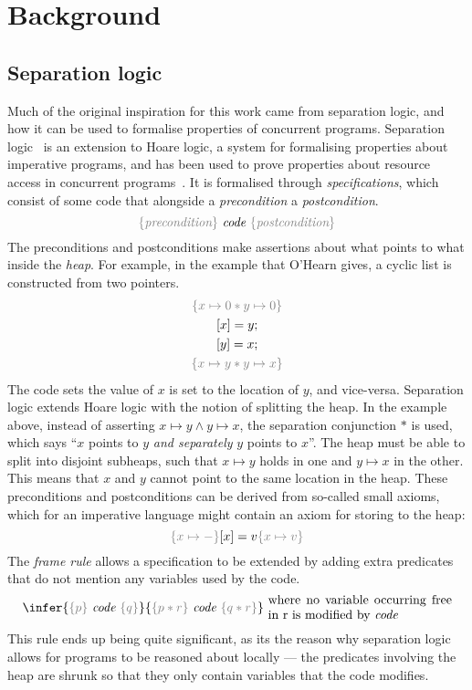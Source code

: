 \chapter{Background}\label{chapter:background}

\section{Separation logic}\label{sec:separationologic}
Much of the original inspiration for this work came from separation
logic, and how it can be used to formalise properties of concurrent
programs. Separation logic~\cite{ohearn2019,reynolds2002} is an
extension to Hoare logic, a system for formalising properties about
imperative programs, and has been used to prove properties about
resource access in concurrent programs~\cite{ohearn2007}. It is
formalised through \emph{specifications}, which consist of some code
that alongside a \emph{precondition} a \emph{postcondition}.
\[
  {\color{gray} \{\textit{precondition}\}} \
  \textit{code} \
  {\color{gray} \{\textit{postcondition}\}}
\]
The preconditions and postconditions make assertions about what points
to what inside the \textit{heap}. For example, in the example that
O'Hearn gives, a cyclic list is constructed from two pointers.
\begin{gather*}
  {\color{gray} \{ x \mapsto 0 * y \mapsto 0 \} }\\
  [x] = y; \\
  [y] = x; \\
  {\color{gray} \{ x \mapsto y * y \mapsto x \} }
\end{gather*}
The code sets the value of $x$ is set to the location of $y$, and
vice-versa. Separation logic extends Hoare logic with the notion of
splitting the heap. In the example above, instead of asserting
$x \mapsto y \wedge y \mapsto x$, the separation conjunction $*$ is used, which says
``$x$ points to $y$ \textit{and separately} $y$ points to $x$''. The
heap must be able to split into disjoint subheaps, such that
$x \mapsto y$ holds in one and $y \mapsto x$ in the other. This means that
$x$ and $y$ cannot point to the same location in the heap.
These preconditions and postconditions can be derived from so-called
small axioms, which for an imperative language might contain an axiom
for storing to the heap:
\[ {\color{gray} \{x \mapsto -\}} [x] = v {\color{gray} \{x \mapsto v\}} \]
The \textit{frame rule} allows a specification to be extended by
adding extra predicates that do not mention any variables used by the
code.
\[
  \infer{{\color{gray} \{p\}} \ \emph{code} \ {\color{gray} \{q\}}}
  {{\color{gray} \{p * r\}} \ \emph{code} \ {\color{gray} \{ q * r \}}} \
  \text{\parbox{2in}{where no variable
    occurring free in r is modified by \emph{code}}}
\]
This rule ends up being quite significant, as its the reason why
separation logic allows for programs to be reasoned about locally ---
the predicates involving the heap are shrunk so that they only contain
variables that the code modifies.

